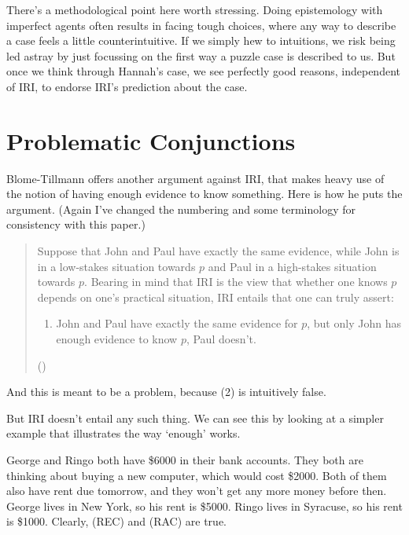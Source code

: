 \documentclass[
  11pt,
  letterpaper,
  DIV=11,
  numbers=noendperiod,
  oneside]{scrartcl}
\providecommand{\tightlist}{%
  \setlength{\itemsep}{0pt}\setlength{\parskip}{0pt}}\usepackage{longtable,booktabs,array}
\begin{document}
There's a methodological point here worth stressing. Doing epistemology
with imperfect agents often results in facing tough choices, where any
way to describe a case feels a little counterintuitive. If we simply hew
to intuitions, we risk being led astray by just focussing on the first
way a puzzle case is described to us. But once we think through Hannah's
case, we see perfectly good reasons, independent of IRI, to endorse
IRI's prediction about the case.

\section{Problematic Conjunctions}\label{sect:conj}

Blome-Tillmann offers another argument against IRI, that makes heavy use
of the notion of having enough evidence to know something. Here is how
he puts the argument. (Again I've changed the numbering and some
terminology for consistency with this paper.)

\begin{quote}
Suppose that John and Paul have exactly the same evidence, while John is
in a low-stakes situation towards \(p\) and Paul in a high-stakes
situation towards \(p\). Bearing in mind that IRI is the view that
whether one knows \(p\) depends on one's practical situation, IRI
entails that one can truly assert:

\begin{enumerate}
\def\labelenumi{\arabic{enumi}.}
\setcounter{enumi}{1}
\tightlist
\item
  John and Paul have exactly the same evidence for \(p\), but only John
  has enough evidence to know \(p\), Paul doesn't.
\end{enumerate}

()
\end{quote}

And this is meant to be a problem, because (2) is intuitively false.

But IRI doesn't entail any such thing. We can see this by looking at a
simpler example that illustrates the way `enough' works.

George and Ringo both have \$6000 in their bank accounts. They both are
thinking about buying a new computer, which would cost \$2000. Both of
them also have rent due tomorrow, and they won't get any more money
before then. George lives in New York, so his rent is \$5000. Ringo
lives in Syracuse, so his rent is \$1000. Clearly, (REC) and (RAC) are
true.
\end{document}
